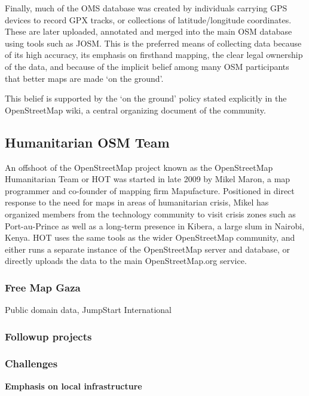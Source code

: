 \documentclass[11pt]{report}
\begin{document}
Finally, much of the OMS database was created by individuals carrying GPS devices to record GPX tracks, or collections of latitude/longitude coordinates. These are later uploaded, annotated and merged into the main OSM database using tools such as JOSM. This is the preferred means of collecting data because of its high accuracy, its emphasis on firsthand mapping, the clear legal ownership of the data, and because of the implicit belief among many OSM participants that better maps are made `on the ground'. 

This belief is supported by the `on the ground' policy stated explicitly in the OpenStreetMap wiki, a central organizing document of the community.

\subsection{Humanitarian OSM Team}
 
An offshoot of the OpenStreetMap project known as the OpenStreetMap Humanitarian Team or HOT was started in late 2009 by Mikel Maron, a map programmer and co-founder of mapping firm Mapufacture. Positioned in direct response to the need for maps in areas of humanitarian crisis, Mikel has organized members from the technology community to visit crisis zones such as Port-au-Prince as well as a long-term presence in Kibera, a large slum in Nairobi, Kenya. HOT uses the same tools as the wider OpenStreetMap community, and either runs a separate instance of the OpenStreetMap server and database, or directly uploads the data to the main OpenStreetMap.org service. 

\subsubsection{Free Map Gaza}


Public domain data, JumpStart International

\subsubsection{Followup projects}
\subsubsection{Challenges}
\textbf{Emphasis on local infrastructure}
\end{document}
